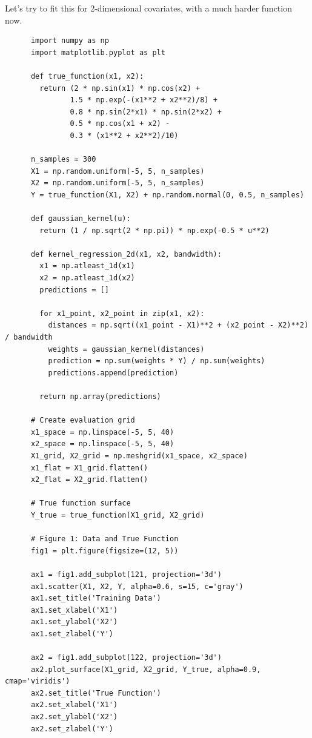   \begin{example}
    \label{ex:gaussian-kernels-in-2-dimensions}
 
    Let's try to fit this for 2-dimensional covariates, with a much harder function now. 

    \begin{lstlisting}
      import numpy as np
      import matplotlib.pyplot as plt

      def true_function(x1, x2):
        return (2 * np.sin(x1) * np.cos(x2) + 
               1.5 * np.exp(-(x1**2 + x2**2)/8) + 
               0.8 * np.sin(2*x1) * np.sin(2*x2) +
               0.5 * np.cos(x1 + x2) - 
               0.3 * (x1**2 + x2**2)/10)

      n_samples = 300
      X1 = np.random.uniform(-5, 5, n_samples)
      X2 = np.random.uniform(-5, 5, n_samples)
      Y = true_function(X1, X2) + np.random.normal(0, 0.5, n_samples)

      def gaussian_kernel(u):
        return (1 / np.sqrt(2 * np.pi)) * np.exp(-0.5 * u**2)

      def kernel_regression_2d(x1, x2, bandwidth):
        x1 = np.atleast_1d(x1)
        x2 = np.atleast_1d(x2)
        predictions = []
        
        for x1_point, x2_point in zip(x1, x2):
          distances = np.sqrt((x1_point - X1)**2 + (x2_point - X2)**2) / bandwidth
          weights = gaussian_kernel(distances)
          prediction = np.sum(weights * Y) / np.sum(weights)
          predictions.append(prediction)
        
        return np.array(predictions)

      # Create evaluation grid
      x1_space = np.linspace(-5, 5, 40)
      x2_space = np.linspace(-5, 5, 40)
      X1_grid, X2_grid = np.meshgrid(x1_space, x2_space)
      x1_flat = X1_grid.flatten()
      x2_flat = X2_grid.flatten()

      # True function surface
      Y_true = true_function(X1_grid, X2_grid)

      # Figure 1: Data and True Function
      fig1 = plt.figure(figsize=(12, 5))

      ax1 = fig1.add_subplot(121, projection='3d')
      ax1.scatter(X1, X2, Y, alpha=0.6, s=15, c='gray')
      ax1.set_title('Training Data')
      ax1.set_xlabel('X1')
      ax1.set_ylabel('X2')
      ax1.set_zlabel('Y')

      ax2 = fig1.add_subplot(122, projection='3d')
      ax2.plot_surface(X1_grid, X2_grid, Y_true, alpha=0.9, cmap='viridis')
      ax2.set_title('True Function')
      ax2.set_xlabel('X1')
      ax2.set_ylabel('X2')
      ax2.set_zlabel('Y')


\end{lstlisting}
\end{example}
